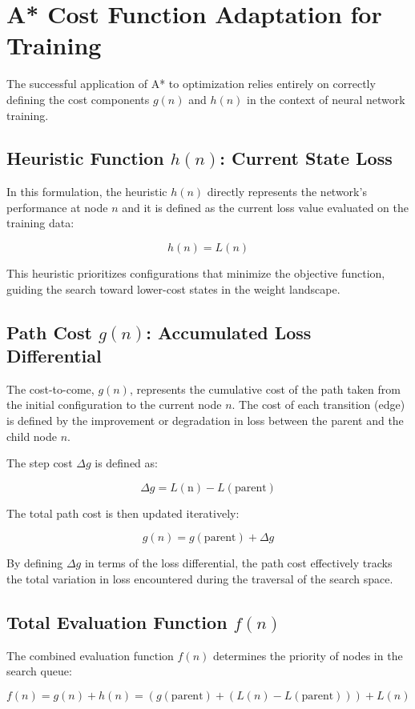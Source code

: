 \chapter{A* Cost Function Adaptation for Training}

The successful application of A* to optimization relies entirely on correctly defining the cost components $g(n)$ and $h(n)$ in the context of neural network training.

\section{Heuristic Function $h(n)$: Current State Loss}
In this formulation, the heuristic $h(n)$ directly represents the network's performance at node $n$ and it is defined as the current loss value evaluated on the training data:

$$h(n) = L(n)$$

This heuristic prioritizes configurations that minimize the objective function, guiding the search toward lower-cost states in the weight landscape.

\section{Path Cost $g(n)$: Accumulated Loss Differential}
The cost-to-come, $g(n)$, represents the cumulative cost of the path taken from the initial configuration to the current node $n$. The cost of each transition (edge) is defined by the improvement or degradation in loss between the parent and the child node $n$.

The step cost $\Delta g$ is defined as:

$$\Delta g = L(\text{n}) - L(\text{parent})$$

The total path cost is then updated iteratively:

$$g(n) = g(\text{parent}) + \Delta g$$

By defining $\Delta g$ in terms of the loss differential, the path cost effectively tracks the total variation in loss encountered during the traversal of the search space.

\section{Total Evaluation Function $f(n)$}
The combined evaluation function $f(n)$ determines the priority of nodes in the search queue:

$$f(n) = g(n) + h(n) = \left( g(\text{parent}) + (L(n) - L(\text{parent})) \right) + L(n)$$

